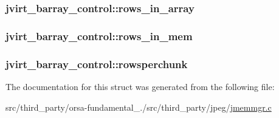 \subsubsection[{rows\+\_\+in\+\_\+array}]{ jvirt\+\_\+barray\+\_\+control\+::rows\+\_\+in\+\_\+array}\label{structjvirt__barray__control_a57c1bf0ff557df3e1e0926e367a6b635}
\hypertarget{structjvirt__barray__control_a23aa025027bba6a29287b1460d72bf71}{}
\subsubsection[{rows\+\_\+in\+\_\+mem}]{ jvirt\+\_\+barray\+\_\+control\+::rows\+\_\+in\+\_\+mem}\label{structjvirt__barray__control_a23aa025027bba6a29287b1460d72bf71}
\hypertarget{structjvirt__barray__control_ad31f701b81d11db2bd5fa33579d9674e}{}
\subsubsection[{rowsperchunk}]{ jvirt\+\_\+barray\+\_\+control\+::rowsperchunk}\label{structjvirt__barray__control_ad31f701b81d11db2bd5fa33579d9674e}


The documentation for this struct was generated from the following file\+:\begin{DoxyCompactItemize}
\item 
src/third\+\_\+party/orsa-\/fundamental\+\_./src/third\+\_\+party/jpeg/\hyperlink{jmemmgr_8c}{jmemmgr.\+c}\end{DoxyCompactItemize}
